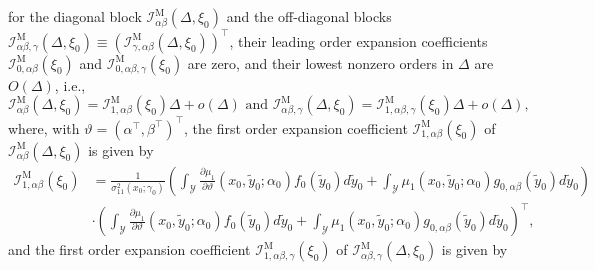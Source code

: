 \documentclass[11pt]{article}%
\theoremstyle{definition}
\begin{document}
\bigskip

\bigskip

\bigskip for the diagonal block $\mathcal{I}_{\alpha\beta}^{\text{M}}%
(\Delta,\xi_{0})$ and the off-diagonal blocks $\mathcal{I}_{\alpha\beta
,\gamma}^{\text{M}}(\Delta,\xi_{0})\equiv(\mathcal{I}_{\gamma,\alpha\beta
}^{\text{M}}(\Delta,\xi_{0}))^{\top}$, their leading order expansion
coefficients $\mathcal{I}_{0,\alpha\beta}^{\text{M}}(\xi_{0})$ and
$\mathcal{I}_{0,\alpha\beta,\gamma}^{\text{M}}(\xi_{0})$ are zero, and their
lowest nonzero orders in $\Delta$ are $O(\Delta)$, i.e.,%
\[
\mathcal{I}_{\alpha\beta}^{\text{M}}(\Delta,\xi_{0})=\mathcal{I}%
_{1,\alpha\beta}^{\text{M}}(\xi_{0})\Delta+o(\Delta)\text{ and }%
\mathcal{I}_{\alpha\beta,\gamma}^{\text{M}}(\Delta,\xi_{0})=\mathcal{I}%
_{1,\alpha\beta,\gamma}^{\text{M}}(\xi_{0})\Delta+o(\Delta),
\]
where, with $\vartheta=(\alpha^{\intercal},\beta^{\intercal})^{\intercal}$,
the first order expansion coefficient $\mathcal{I}_{1,\alpha\beta}^{\text{M}%
}(\xi_{0})$ of $\mathcal{I}_{\alpha\beta}^{\text{M}}(\Delta,\xi_{0})$ is given
by
\begin{align}
\mathcal{I}_{1,\alpha\beta}^{\text{M}}(\xi_{0}) &  =\frac{1}{\sigma_{11}%
^{2}(x_{0};\gamma_{0})}\left(  \int_{\mathcal{Y}}\frac{\partial\mu_{1}%
}{\partial\vartheta}(x_{0},\tilde{y}_{0};\alpha_{0})f_{0}(\tilde{y}%
_{0})d\tilde{y}_{0}+\int_{\mathcal{Y}}\mu_{1}(x_{0},\tilde{y}_{0};\alpha
_{0})g_{0,\alpha\beta}(\tilde{y}_{0})d\tilde{y}_{0}\right)
\label{I_M_1 ab SD}\\
&  \cdot\left(  \int_{\mathcal{Y}}\frac{\partial\mu_{1}}{\partial\vartheta
}(x_{0},\tilde{y}_{0};\alpha_{0})f_{0}(\tilde{y}_{0})d\tilde{y}_{0}%
+\int_{\mathcal{Y}}\mu_{1}(x_{0},\tilde{y}_{0};\alpha_{0})g_{0,\alpha\beta
}(\tilde{y}_{0})d\tilde{y}_{0}\right)  ^{\intercal},\nonumber
\end{align}
and the first order expansion coefficient $\mathcal{I}_{1,\alpha\beta,\gamma
}^{\text{M}}(\xi_{0})$ of $\mathcal{I}_{\alpha\beta,\gamma}^{\text{M}}%
(\Delta,\xi_{0})$ is given by%
\end{document}
